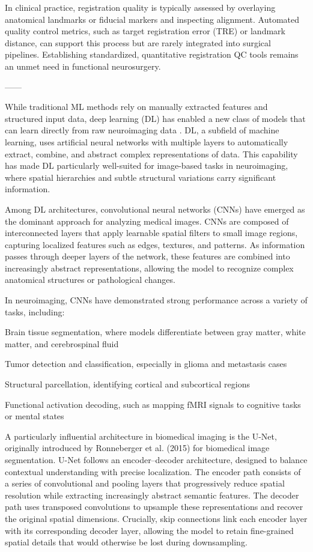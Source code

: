 In clinical practice, registration quality is typically assessed by overlaying anatomical landmarks or fiducial markers and inspecting alignment. Automated quality control metrics, such as target registration error (TRE) or landmark distance, can support this process but are rarely integrated into surgical pipelines. Establishing standardized, quantitative registration QC tools remains an unmet need in functional neurosurgery.



------

While traditional ML methods rely on manually extracted features and structured input data, deep learning (DL) has enabled a new class of models that can learn directly from raw neuroimaging data \cite{Sarker2021-fo}. DL, a subfield of machine learning, uses artificial neural networks with multiple layers to automatically extract, combine, and abstract complex representations of data. This capability has made DL particularly well-suited for image-based tasks in neuroimaging, where spatial hierarchies and subtle structural variations carry significant information.

Among DL architectures, convolutional neural networks (CNNs) have emerged as the dominant approach for analyzing medical images. CNNs are composed of interconnected layers that apply learnable spatial filters to small image regions, capturing localized features such as edges, textures, and patterns. As information passes through deeper layers of the network, these features are combined into increasingly abstract representations, allowing the model to recognize complex anatomical structures or pathological changes.

In neuroimaging, CNNs have demonstrated strong performance across a variety of tasks, including:

Brain tissue segmentation, where models differentiate between gray matter, white matter, and cerebrospinal fluid

Tumor detection and classification, especially in glioma and metastasis cases

Structural parcellation, identifying cortical and subcortical regions

Functional activation decoding, such as mapping fMRI signals to cognitive tasks or mental states

A particularly influential architecture in biomedical imaging is the U-Net, originally introduced by Ronneberger et al. (2015) for biomedical image segmentation. U-Net follows an encoder–decoder architecture, designed to balance contextual understanding with precise localization. The encoder path consists of a series of convolutional and pooling layers that progressively reduce spatial resolution while extracting increasingly abstract semantic features. The decoder path uses transposed convolutions to upsample these representations and recover the original spatial dimensions. Crucially, skip connections link each encoder layer with its corresponding decoder layer, allowing the model to retain fine-grained spatial details that would otherwise be lost during downsampling.


